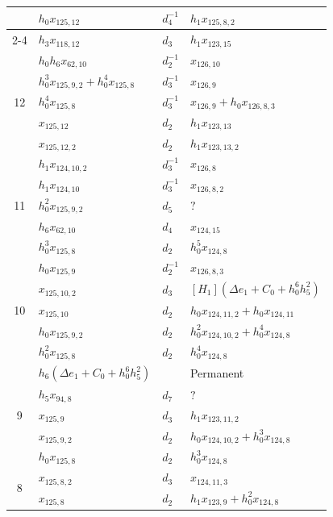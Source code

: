 \documentclass{amsart}
\numberwithin{equation}{section}
\begin{document}
\begin{table}
{\begin{tabular}{|c|l|l|l|}
 & $h_0x_{125,12}$ & $d_{4}^{-1}$ & $h_1x_{125,8,2}$ \\\cline{2-4}
 & $h_3x_{118,12}$ & $d_{3}$ & $h_1x_{123,15}$ \\\hline\hline
\multirow{5}{*}{12} & $h_0h_6x_{62,10}$ & $d_{2}^{-1}$ & $x_{126,10}$ \\\cline{2-4}
 & $h_0^3x_{125,9,2}+h_0^4x_{125,8}$ & $d_{3}^{-1}$ & $x_{126,9}$ \\\cline{2-4}
 & $h_0^4x_{125,8}$ & $d_{3}^{-1}$ & $x_{126,9}+h_0x_{126,8,3}$ \\\cline{2-4}
 & $x_{125,12}$ & $d_{2}$ & $h_1x_{123,13}$ \\\cline{2-4}
 & $x_{125,12,2}$ & $d_{2}$ & $h_1x_{123,13,2}$ \\\hline\hline
\multirow{5}{*}{11} & $h_1x_{124,10,2}$ & $d_{3}^{-1}$ & $x_{126,8}$ \\\cline{2-4}
 & $h_1x_{124,10}$ & $d_{3}^{-1}$ & $x_{126,8,2}$ \\\cline{2-4}
 & $h_0^2x_{125,9,2}$ & $d_{5}$ & $?$ \\\cline{2-4}
 & $h_6x_{62,10}$ & $d_{4}$ & $x_{124,15}$ \\\cline{2-4}
 & $h_0^3x_{125,8}$ & $d_{2}$ & $h_0^5x_{124,8}$ \\\hline\hline
\multirow{5}{*}{10} & $h_0x_{125,9}$ & $d_{2}^{-1}$ & $x_{126,8,3}$ \\\cline{2-4}
 & $x_{125,10,2}$ & $d_{3}$ & $[H_1](\Delta e_1+C_0+h_0^6h_5^2)$ \\\cline{2-4}
 & $x_{125,10}$ & $d_{2}$ & $h_0x_{124,11,2}+h_0x_{124,11}$ \\\cline{2-4}
 & $h_0x_{125,9,2}$ & $d_{2}$ & $h_0^2x_{124,10,2}+h_0^4x_{124,8}$ \\\cline{2-4}
 & $h_0^2x_{125,8}$ & $d_{2}$ & $h_0^4x_{124,8}$ \\\hline\hline
\multirow{5}{*}{9} & $h_6(\Delta e_1+C_0+h_0^6h_5^2)$ & & Permanent \\\cline{2-4}
 & $h_5x_{94,8}$ & $d_{7}$ & $?$ \\\cline{2-4}
 & $x_{125,9}$ & $d_{3}$ & $h_1x_{123,11,2}$ \\\cline{2-4}
 & $x_{125,9,2}$ & $d_{2}$ & $h_0x_{124,10,2}+h_0^3x_{124,8}$ \\\cline{2-4}
 & $h_0x_{125,8}$ & $d_{2}$ & $h_0^3x_{124,8}$ \\\hline\hline
\multirow{2}{*}{8} & $x_{125,8,2}$ & $d_{3}$ & $x_{124,11,3}$ \\\cline{2-4}
 & $x_{125,8}$ & $d_{2}$ & $h_1x_{123,9}+h_0^2x_{124,8}$ \\\hline\hline

\end{tabular}}
\end{table}
\end{document}

